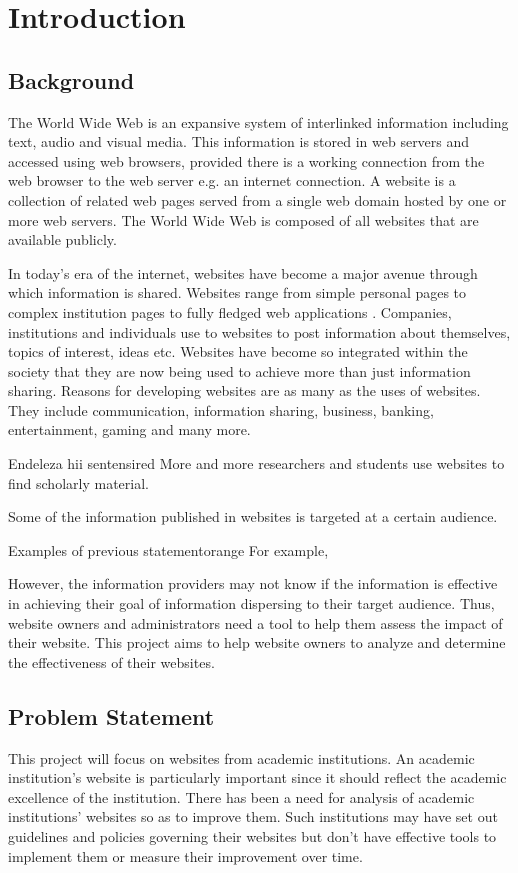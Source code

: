 \chapter{Introduction}
\section{Background}

The World Wide Web is an expansive system of interlinked information including text, audio and visual media. This information is stored in web servers and accessed using web browsers, provided there is a working connection from the web browser to the web server e.g. an internet connection. A website is a collection of related web pages served from a single web domain hosted by one or more web servers. The World Wide Web is composed of all websites that are available publicly.


\noindent
In today's era of the internet, websites have become a major avenue through which information is shared. Websites range from simple personal pages to complex institution pages to fully fledged web applications . Companies, institutions and individuals use to websites to post information about themselves, topics of interest, ideas etc. Websites have become so integrated within the society that they are now being used to achieve more than just information sharing. Reasons for developing websites are as many as the uses of websites. They include communication, information sharing, business, banking, entertainment, gaming and many more.


\begin{review_comment}{Endeleza hii sentensi}{red}
{More and more researchers and students use websites to find scholarly material.
}\end{review_comment}

Some of the information published in websites is targeted at a certain audience. \begin{review_comment}{Examples of previous statement}{orange}
{For example,}\end{review_comment}
However, the information providers may not know if the information is effective in achieving their goal of information dispersing to their target audience. Thus, website owners and administrators need a tool to help them assess the impact of their website. This project aims to help website owners to analyze and determine the effectiveness of their websites.


\section{Problem Statement}
This project will focus on websites from academic institutions. An academic institution's website is particularly important since it should reflect the academic excellence of the institution. There has been a need for analysis of academic institutions' websites so as to improve them. Such institutions may have set out guidelines and policies governing their websites but don't have effective tools to implement them or measure their improvement over time.

